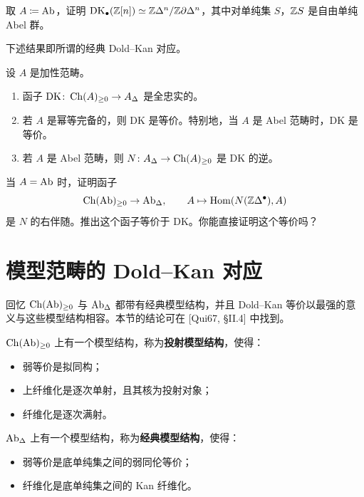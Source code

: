 \begin{exercise}\label{L18-1.17}
取 $A\coloneqq\operatorname{Ab}$，证明 $\mathrm{DK}_{\bullet}(\mathbb{Z}[n])\simeq\mathbb{Z}\Delta^{n}/\mathbb{Z}\partial\Delta^{n}$，其中对单纯集 $S$，$\mathbb{Z} S$ 是自由单纯 Abel 群。
\end{exercise}

\nitem\label{L18-1.18} 下述结果即所谓的经典 Dold–Kan 对应。

\begin{theorem}[HA.1.2.3.7, 1.2.3.12]\label{L18-1.19}
设 $A$ 是加性范畴。
\begin{enumerate}[label=(\arabic*),leftmargin=2.4em,itemsep=0.1em]
\item 函子 $\mathrm{DK}\colon\operatorname{Ch}(A)_{\ge 0}\to A_{\Delta}$ 是全忠实的。
\item 若 $A$ 是幂等完备的，则 $\mathrm{DK}$ 是等价。特别地，当 $A$ 是 Abel 范畴时，$\mathrm{DK}$ 是等价。
\item 若 $A$ 是 Abel 范畴，则 $N\colon A_{\Delta}\to\operatorname{Ch}(A)_{\ge 0}$ 是 $\mathrm{DK}$ 的逆。
\end{enumerate}
\end{theorem}

\begin{exercise}\label{L18-1.20}
当 $A=\operatorname{Ab}$ 时，证明函子
\[
\operatorname{Ch}(\operatorname{Ab})_{\ge 0}\to\operatorname{Ab}_{\Delta},\qquad A\mapsto\operatorname{Hom}(N(\mathbb{Z}\Delta^{\bullet}),A)
\]
是 $N$ 的右伴随。推出这个函子等价于 $\mathrm{DK}$。你能直接证明这个等价吗？
\end{exercise}

\section{模型范畴的 Dold–Kan 对应}

\nitem\label{L18-2.1} 回忆 $\operatorname{Ch}(\operatorname{Ab})_{\ge 0}$ 与 $\operatorname{Ab}_{\Delta}$ 都带有经典模型结构，并且 Dold–Kan 等价以最强的意义与这些模型结构相容。本节的结论可在 [Qui67, §II.4] 中找到。

\begin{proposition}\label{L18-2.2}
$\operatorname{Ch}(\operatorname{Ab})_{\ge 0}$ 上有一个模型结构，称为\textbf{投射模型结构}，使得：
\begin{itemize}[leftmargin=2.2em,itemsep=0.1em]
\item[(W)] 弱等价是拟同构；
\item[(C)] 上纤维化是逐次单射，且其核为投射对象；
\item[(F)] 纤维化是逐次满射。
\end{itemize}
\end{proposition}

\begin{proposition}\label{L18-2.3}
$\operatorname{Ab}_{\Delta}$ 上有一个模型结构，称为\textbf{经典模型结构}，使得：
\begin{itemize}[leftmargin=2.2em,itemsep=0.1em]
\item[(W)] 弱等价是底单纯集之间的弱同伦等价；
\item[(F)] 纤维化是底单纯集之间的 Kan 纤维化。
\end{itemize}
\end{proposition}

